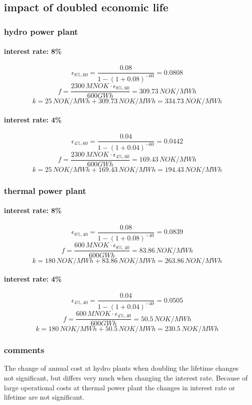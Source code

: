 \documentclass{article}
\begin{document}
\subsection{impact of doubled economic life}
\subsubsection{hydro power plant}
\paragraph{interest rate: 8\%\\}
$$\epsilon_{8\%,60}=\frac{0.08}{1-(1+0.08)^{-60}}=0.0808$$
$$f=\frac{2300\,MNOK\cdot\epsilon_{8\%,60}}{600GWh}=309.73\,NOK/MWh$$
$$k=25\,NOK/MWh+309.73\,NOK/MWh=334.73\,NOK/MWh$$
\paragraph{interest rate: 4\%\\}
$$\epsilon_{4\%,60}=\frac{0.04}{1-(1+0.04)^{-60}}=0.0442$$
$$f=\frac{2300\,MNOK\cdot\epsilon_{4\%,60}}{600GWh}=169.43\,NOK/MWh$$
$$k=25\,NOK/MWh+169.43\,NOK/MWh=194.43\,NOK/MWh$$
\subsubsection{thermal power plant}
\paragraph{interest rate: 8\%\\}
$$\epsilon_{8\%,40}=\frac{0.08}{1-(1+0.08)^{-40}}=0.0839$$
$$f=\frac{600\,MNOK\cdot\epsilon_{8\%,40}}{600GWh}=83.86\,NOK/MWh$$
$$k=180\,NOK/MWh+83.86\,NOK/MWh=263.86\,NOK/MWh$$
\paragraph{interest rate: 4\%\\}
$$\epsilon_{4\%,40}=\frac{0.04}{1-(1+0.04)^{-40}}=0.0505$$
$$f=\frac{600\,MNOK\cdot\epsilon_{4\%,40}}{600GWh}=50.5\,NOK/MWh$$
$$k=180\,NOK/MWh+50.5\,NOK/MWh=230.5\,NOK/MWh$$
\subsubsection{comments}
The change of annual cost at hydro plants when doubling the lifetime changes not significant, but differs very much when changing the interest rate. Because of large operational costs at thermal power plant the changes in interest rate or lifetime are not significant.
\end{document}
